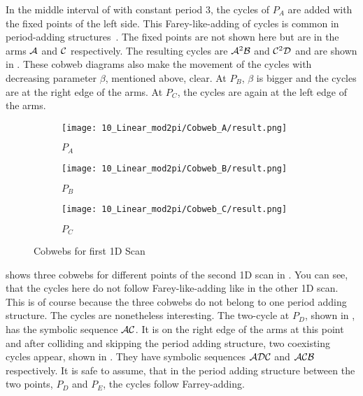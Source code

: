 In the middle interval of  with constant period 3, the cycles of $P_A$ are added with the fixed points of the left side.
This Farey-like-adding of cycles is common in period-adding structures~\cite{avrutin2019continuous}.
The fixed points are not shown here but are in the arms $\mathcal{A}$ and $\mathcal{C}$ respectively.
The resulting cycles are $\mathcal{A}^2\mathcal{B}$ and $\mathcal{C}^2\mathcal{D}$ and are shown in .
These cobweb diagrams also make the movement of the cycles with decreasing parameter $\beta$, mentioned above, clear.
At $P_B$, $\beta$ is bigger and the cycles are at the right edge of the arms.
At $P_C$, the cycles are again at the left edge of the arms.

\begin{figure}
    \centering
    \begin{subfigure}{0.3\textwidth}
        \centering
        \texttt{[image: 10\_Linear\_mod2pi/Cobweb\_A/result.png]}
        \caption{$P_A$}
        \label{fig:pcw.lin.CobwebA}
    \end{subfigure}
    \begin{subfigure}{0.3\textwidth}
        \centering
        \texttt{[image: 10\_Linear\_mod2pi/Cobweb\_B/result.png]}
        \caption{$P_B$}
        \label{fig:pcw.lin.CobwebB}
    \end{subfigure}
    \begin{subfigure}{0.3\textwidth}
        \centering
        \texttt{[image: 10\_Linear\_mod2pi/Cobweb\_C/result.png]}
        \caption{$P_C$}
        \label{fig:pcw.lin.CobwebC}
    \end{subfigure}
    \caption{Cobwebs for first 1D Scan}
    \label{fig:pcw.lin.CobwebA-C}
\end{figure}

 shows three cobwebs for different points of the second 1D scan in .
You can see, that the cycles here do not follow Farey-like-adding like in the other 1D scan.
This is of course because the three cobwebs do not belong to one period adding structure.
The cycles are nonetheless interesting.
The two-cycle at $P_D$, shown in , has the symbolic sequence $\mathcal{A}\mathcal{C}$.
It is on the right edge of the arms at this point and after colliding and skipping the period adding structure, two coexisting cycles appear, shown in .
They have symbolic sequences $\mathcal{A}\mathcal{D}\mathcal{C}$ and $\mathcal{A}\mathcal{C}\mathcal{B}$ respectively.
It is safe to assume, that in the period adding structure between the two points, $P_D$ and $P_E$, the cycles follow Farrey-adding.

